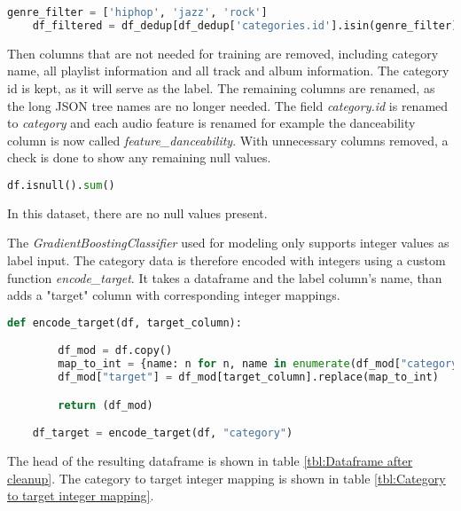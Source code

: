 \begin{lstlisting}[language=Python]
    genre_filter = ['hiphop', 'jazz', 'rock']
    df_filtered = df_dedup[df_dedup['categories.id'].isin(genre_filter)]
\end{lstlisting}

Then columns that are not needed for training are removed, including category name, all playlist information and
all track and album information. The category id is kept, as it will serve as the label.
The remaining columns are renamed, as the long JSON tree names are no longer needed.
The field \emph{category.id} is renamed to \emph{category} and each audio feature is renamed for example 
the danceability column is now called \emph{feature\_danceability}.
With unnecessary columns removed, a check is done to show any remaining null values.

\begin{lstlisting}[language=Python]
    df.isnull().sum()
\end{lstlisting}

In this dataset, there are no null values present.

The \emph{GradientBoostingClassifier} used for modeling only supports integer values as label input.
The category data is therefore encoded with integers using a custom function \emph{encode\_target}.
It takes a dataframe and the label column's name, than adds a "target" column with corresponding integer mappings.

\begin{lstlisting}[language=Python]
    def encode_target(df, target_column):

        df_mod = df.copy()
        map_to_int = {name: n for n, name in enumerate(df_mod["category"].unique())}
        df_mod["target"] = df_mod[target_column].replace(map_to_int)

        return (df_mod)

    df_target = encode_target(df, "category")
\end{lstlisting}

The head of the resulting dataframe is shown in table \ref{tbl:Dataframe after cleanup}.
The category to target integer mapping is shown in table \ref{tbl:Category to target integer mapping}.

